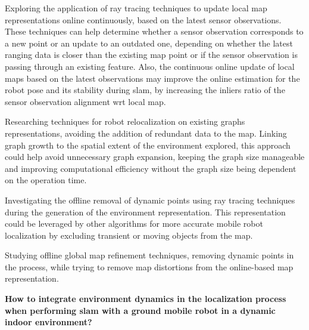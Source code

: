 \begin{hypothesis}\label{hypothesis:mapping:ray-tracing}
Exploring the application of ray tracing techniques to update local map
representations online continuously, based on the latest sensor observations.
These techniques can help determine whether a sensor observation corresponds
to a new point or an update to an outdated one,
depending on whether the latest ranging data is closer than the existing map
point or if the sensor observation is passing through an existing feature.
Also, the continuous online update of local maps based on the latest
observations may improve the online estimation for the robot pose and
its stability during \gls{slam}, by increasing the inliers ratio of
the sensor observation alignment \gls{wrt} local map.
\end{hypothesis}

\begin{hypothesis}\label{hypothesis:mapping:relocalization}
Researching techniques for robot relocalization on existing graphs
representations, avoiding the addition of redundant data to the map.
Linking graph growth to the spatial extent of the environment explored,
this approach could help avoid unnecessary graph expansion,
keeping the graph size manageable and improving computational efficiency
without the graph size being dependent on the operation time.
\end{hypothesis}

\begin{hypothesis}\label{hypothesis:mapping:clean-map}
Investigating the offline removal of dynamic points using ray tracing techniques
during the generation of the environment representation.
This representation could be leveraged by other algorithms for more accurate
mobile robot localization by excluding transient or moving objects from the map.
\end{hypothesis}

\begin{hypothesis}\label{hypothesis:mapping:ogba}
Studying offline global map refinement techniques, removing dynamic points in
the process, while trying to remove map distortions from the online-based
map representation.
\end{hypothesis}

\begin{question}\label{question:localization}
\textbf{How to integrate environment dynamics in the localization process
when performing \gls{slam} with a ground mobile robot
in a dynamic indoor environment?}
\end{question}

